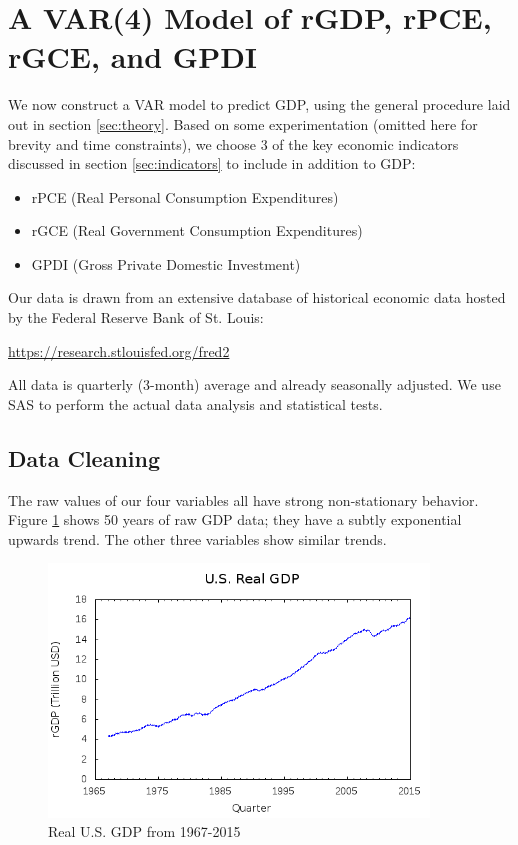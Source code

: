 \newpage
\section{A VAR(4) Model of rGDP, rPCE, rGCE, and GPDI}

    We now construct a VAR model to predict GDP, using the general procedure 
    laid out in section \ref{sec:theory}.  Based on some experimentation 
    (omitted here for brevity and time constraints), we choose 3 of the key 
    economic indicators discussed in section \ref{sec:indicators} to include in 
    addition to GDP:
    \begin{itemize}
        \item rPCE (Real Personal Consumption Expenditures)
        \item rGCE (Real Government Consumption Expenditures)
        \item GPDI (Gross Private Domestic Investment)
    \end{itemize}
    
    Our data is drawn from an extensive database of historical
    economic data hosted by the Federal Reserve Bank of St. Louis:
    
    \begin{center} \url{https://research.stlouisfed.org/fred2} \end{center}

    All data is quarterly (3-month) average and already seasonally adjusted.
    We use SAS to perform the actual data analysis and statistical tests.

\subsection{Data Cleaning}
    
    The raw values of our four variables all have strong non-stationary 
    behavior.  Figure \ref{fig:rgdp} shows 50 years of raw GDP data; they
    have a subtly exponential upwards trend.  The other three variables show 
    similar trends.
    
    \begin{figure}
        \begin{center}
        \includegraphics[width=0.9\textwidth]{../img/rgdp.png}
        \end{center}
        \caption{Real U.S. GDP from 1967-2015}
        \label{fig:rgdp}
    \end{figure}
    
